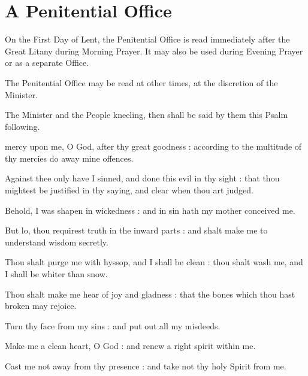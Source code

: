 \label{penitential}
\fancyhead[RE,LO]{}
\section{A Penitential Office}
\begin{rubric}
	On the First Day of Lent, the Penitential Office is read immediately after the Great Litany during Morning Prayer. It may also be used during Evening Prayer or as a separate Office.
\end{rubric}
\begin{rubric}
    The Penitential Office may be read at other times, at the discretion of the Minister.
\end{rubric}
\begin{rubric}
    The Minister and the People kneeling, then shall be said by them this Psalm following.
\end{rubric}
 mercy upon me, O God, after thy great goodness : according to the multitude of thy mercies do away mine offences.\par
{}
Against thee only have I sinned, and done this evil in thy sight : that thou mightest be justified in thy saying, and clear when thou art judged.\par
{}Behold, I was shapen in wickedness : and in sin hath my mother conceived me.\par
{}But lo, thou requirest truth in the inward parts : and shalt make me to understand wisdom secretly.\par
{}Thou shalt purge me with hyssop, and I shall be clean : thou shalt wash me, and I shall be whiter than snow.\par
{}Thou shalt make me hear of joy and gladness : that the bones which thou hast broken may rejoice.\par
{}Turn thy face from my sins : and put out all my misdeeds.\par
{}Make me a clean heart, O God : and renew a right spirit within me.\par
{}Cast me not away from thy presence : and take not thy holy Spirit from me.\par
